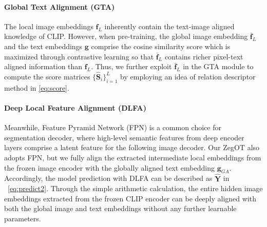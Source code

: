 \documentclass[nohyperref]{article}
\newcommand{\add}[1] {\textcolor{blue}{#1}} %
\newcommand{\bs}{\boldsymbol}
\newcommand{\mbf}{\mathbf}
\theoremstyle{plain}
\theoremstyle{definition}
\theoremstyle{remark}
\begin{document}
 \paragraph{Global Text Alignment (GTA)}
 The local image embeddings $\bs{f}_L$ inherently contain the text-image aligned knowledge of CLIP. 
However, when pre-training, the global image embedding $\bs{\bar{f}}_L$  and the text embeddings  $\bs{g}$ comprise the cosine similarity score which is maximized through contrastive learning so that $\bs{\bar{f}}_L$ contains richer pixel-text aligned information than $\bs{f}_L$. 
Thus, we further exploit $\bs{\bar{f}}_L$ in the GTA module to compute the score matrices $\{\bs{\hat S}_i\}_{i=1}^{L}$  by employing an idea of relation descriptor method \cite{zhou2022zegclip} in \eqref{eq:score}. 

\paragraph{Deep Local Feature Alignment (DLFA)}
 Meanwhile, Feature Pyramid Network (FPN) \cite{lin2017fpn} is a common choice for segmentation decoder, 
where high-level semantic features from deep encoder layers comprise a latent feature for the following image decoder.
 Our ZegOT also adopts FPN,  but we fully align the extracted intermediate local embeddings from the frozen image encoder with the globally aligned text embedding $\bs{g}_{GA}
 $. Accordingly, the model prediction with DLFA can be described as $\mbf{\hat Y}$ in ~\eqref{eq:predict2}.
Through the simple arithmetic calculation, the entire hidden image embeddings extracted from the frozen CLIP encoder can be deeply aligned with both the global image and text embeddings without any further learnable parameters.
\end{document}
